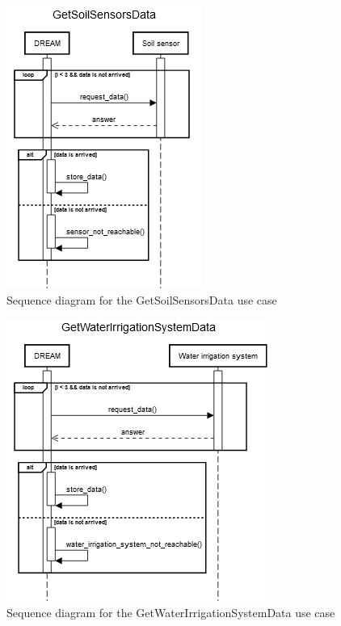 \documentclass{article}
\begin{document}
\begin{figure}[h]
    \centering
    \includegraphics[scale=0.75]{sequence_diagrams/GetSoilSensorsData}
    \caption{Sequence diagram for the GetSoilSensorsData use case}
\end{figure}

\begin{figure}[h]
    \centering
    \includegraphics[scale=0.75]{sequence_diagrams/GetWaterIrrigationSystemData}
    \caption{Sequence diagram for the GetWaterIrrigationSystemData use case}
\end{figure}
\end{document}
